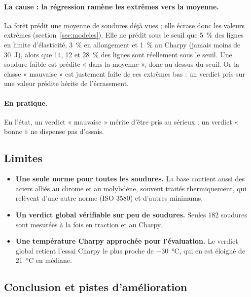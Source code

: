 \paragraph{La cause : la régression ramène les extrêmes vers la moyenne.} La forêt
prédit une moyenne de soudures déjà vues ; elle écrase donc les valeurs extrêmes
(section~\ref{sec:modeles}). Elle ne prédit sous le seuil que \SI{5}{\percent} des
lignes en limite d'élasticité, \SI{3}{\percent} en allongement et \SI{1}{\percent} au
Charpy (jamais moins de \SI{30}{\joule}), alors que 14, 12 et \SI{28}{\percent} des
lignes sont réellement sous le seuil. Une soudure faible est prédite « dans la
moyenne », donc au-dessus du seuil. Or la classe « mauvaise » est justement faite de
ces extrêmes bas : un verdict pris sur une valeur prédite hérite de l'écrasement.

\paragraph{En pratique.} En l'état, un verdict « mauvaise » mérite d'être pris au
sérieux ; un verdict « bonne » ne dispense pas d'essais.


\subsection{Limites}\label{sec:classif-limites}

\begin{itemize}
  \item \textbf{Une seule norme pour toutes les soudures.} La base contient aussi des
    aciers alliés au chrome et au molybdène, souvent traités thermiquement, qui relèvent
    d'une autre norme (ISO 3580) et d'autres minimums.
  \item \textbf{Un verdict global vérifiable sur peu de soudures.} Seules 182 soudures
    sont mesurées à la fois en traction et au Charpy.
  \item \textbf{Une température Charpy approchée pour l'évaluation.} Le verdict global
    retient l'essai Charpy le plus proche de \SI{-30}{\celsius}, qui en est éloigné de
    \SI{21}{\celsius} en médiane.
\end{itemize}

\subsection{Conclusion et pistes d'amélioration}\label{sec:classif-conclusion}

